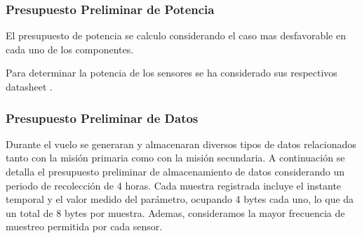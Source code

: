     \subsubsection{Presupuesto Preliminar de Potencia}
      El presupuesto de potencia se calculo considerando el caso mas desfavorable en cada uno
      de los componentes.

      \begin{table}[H]
      \centering
      \caption{Consumo de corriente y potencia de los componentes en el caso más desfavorable.}
      \label{tab:consumo_componentes}
      \end{table}

      Para determinar la potencia de los sensores se ha considerado sus respectivos datasheet \cite{datasheet-mpu9250} \cite{datasheet-bpm280}.

    \subsubsection{Presupuesto Preliminar de Datos}
      Durante el vuelo se generaran y almacenaran diversos tipos de datos relacionados tanto
      con la misión primaria como con la misión secundaria. A continuación se detalla el presupuesto preliminar de almacenamiento de datos considerando un periodo de recolección de 4
      horas.
      Cada muestra registrada incluye el instante temporal y el valor medido del parámetro, ocupando 4 bytes cada uno, lo que da un total de 8 bytes por muestra. Ademas, consideramos
      la mayor frecuencia de muestreo permitida por cada sensor.

